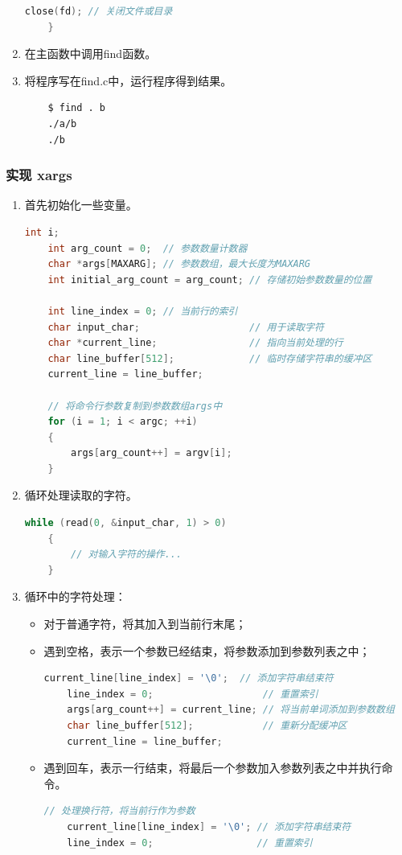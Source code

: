 \begin{enumerate}
\begin{lstlisting}[language=c, title=find函数的实现]
        close(fd); // 关闭文件或目录
    }
    \end{lstlisting}
    \item 在主函数中调用find函数。
    \item 将程序写在find.c中，运行程序得到结果。
          \begin{lstlisting}
    $ find . b
    ./a/b
    ./b
    \end{lstlisting}
\end{enumerate}

\subsubsection{实现 xargs}
\begin{enumerate}
    \item 首先初始化一些变量。
          \begin{lstlisting}[language=c, title=初始化]
    int i;
    int arg_count = 0;  // 参数数量计数器
    char *args[MAXARG]; // 参数数组，最大长度为MAXARG
    int initial_arg_count = arg_count; // 存储初始参数数量的位置
    
    int line_index = 0; // 当前行的索引
    char input_char;                   // 用于读取字符
    char *current_line;                // 指向当前处理的行
    char line_buffer[512];             // 临时存储字符串的缓冲区
    current_line = line_buffer;

    // 将命令行参数复制到参数数组args中
    for (i = 1; i < argc; ++i)
    {
        args[arg_count++] = argv[i];
    }
    \end{lstlisting}
    \item 循环处理读取的字符。
          \begin{lstlisting}[language=c, title=输入处理循环]
    while (read(0, &input_char, 1) > 0)
    {
        // 对输入字符的操作...
    }
    \end{lstlisting}
    \item 循环中的字符处理：\begin{itemize}
              \item 对于普通字符，将其加入到当前行末尾；
              \item 遇到空格，表示一个参数已经结束，将参数添加到参数列表之中；
                    \begin{lstlisting}[language=c, title=空格的处理]
    current_line[line_index] = '\0';  // 添加字符串结束符
    line_index = 0;                   // 重置索引
    args[arg_count++] = current_line; // 将当前单词添加到参数数组
    char line_buffer[512];            // 重新分配缓冲区
    current_line = line_buffer;
        \end{lstlisting}
              \item 遇到回车，表示一行结束，将最后一个参数加入参数列表之中并执行命令。
                    \begin{lstlisting}[language=c, title=回车的处理]
    // 处理换行符，将当前行作为参数
    current_line[line_index] = '\0'; // 添加字符串结束符
    line_index = 0;                  // 重置索引


\end{lstlisting}
\end{itemize}
\end{enumerate}
